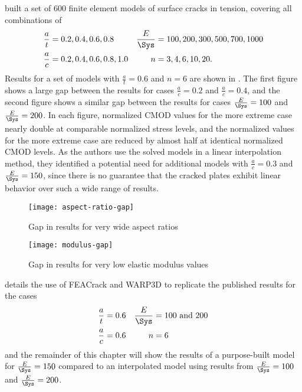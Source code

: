 \citeauthor{allenwells2014} built a set of 600 finite element models of surface cracks in tension, covering all combinations of
\begin{align*}
\frac{a}{t} &= 0.2, 0.4, 0.6, 0.8 & \frac{E}{\Sys} &= 100, 200, 300, 500, 700, 1000 \\
\frac{a}{c} &= 0.2, 0.4, 0.6, 0.8, 1.0 & n &= 3, 4, 6, 10, 20.
\end{align*}
Results for a set of models with \(\frac{a}{t}=0.6\) and \(n=6\) are shown in .
The first figure shows a large gap between the results for cases \(\frac{a}{c}=0.2\) and \(\frac{a}{c}=0.4\), and the second figure shows a similar gap between the results for cases \(\frac{E}{\Sys}=100\) and \(\frac{E}{\Sys}=200\).
In each figure, normalized CMOD values for the more extreme case nearly double at comparable normalized stress levels, and the normalized \J values for the more extreme case are reduced by almost half at identical normalized CMOD levels.
As the authors use the solved models in a linear interpolation method, they identified a potential need for additional models with \(\frac{a}{c}=0.3\) and \(\frac{E}{\Sys}=150\), since there is no guarantee that the cracked plates exhibit linear behavior over such a wide range of results.
\begin{frame}
\begin{figure}[tbp]
\centering
\texttt{[image: aspect-ratio-gap]}
\caption{\label{fig:aspect-ratio-gap} Gap in results for very wide aspect ratios \citep{allenwells2014}}
\end{figure}
\begin{figure}[tbp]
\centering
\texttt{[image: modulus-gap]}
\caption{\label{fig:modulus-gap} Gap in results for very low elastic modulus values \citep{allenwells2014}}
\end{figure}
\end{frame}

 details the use of FEACrack \citep{feacrack} and WARP3D \citep{warp3d} to replicate the published results for the cases
\begin{align*}
\frac{a}{t} &= 0.6 & \frac{E}{\Sys} &= 100 \text{ and } 200\\
\frac{a}{c} &= 0.6 & n &= 6
\end{align*}
and the remainder of this chapter will show the results of a purpose-built model for \(\frac{E}{\Sys} = 150\) compared to an interpolated model using results from \(\frac{E}{\Sys}=100\) and \(\frac{E}{\Sys}=200\).

